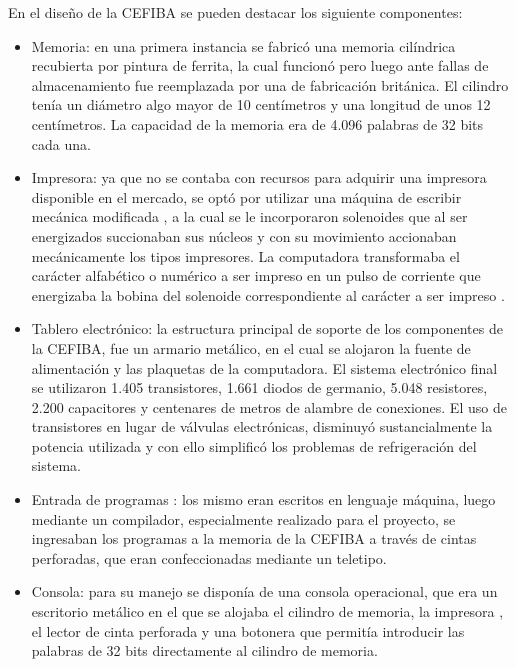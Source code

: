 \documentclass[%
 	final,
%
	notitlepage,
	narroweqnarray,
	inline,
 	twoside,
	]{ieee}
\begin{document}
En el dise\~no de la CEFIBA se pueden destacar los siguiente componentes:
\begin{itemize}
\item  Memoria: en una primera instancia se fabric\'o una memoria cil\'indrica recubierta por pintura de ferrita, la cual funcion\'o pero luego ante fallas de almacenamiento fue reemplazada por una de fabricaci\'on brit\'anica. El cilindro ten\'ia un di\'ametro algo mayor de 10 cent\'imetros y una longitud 
de unos 12 cent\'imetros. La capacidad de la memoria era de 4.096 palabras de 32 bits cada una.

\item Impresora: ya que no se contaba con recursos para adquirir una impresora disponible en el mercado, se opt\'o por utilizar una m\'aquina de escribir mec\'anica modificada , a la cual se le
incorporaron solenoides que al ser energizados succionaban sus n\'ucleos y con su movimiento accionaban mec\'anicamente los tipos impresores. La computadora transformaba el car\'acter alfab\'etico o num\'erico a ser impreso en un pulso de corriente que energizaba la bobina del solenoide correspondiente al car\'acter a ser impreso .

\item Tablero electr\'onico: la estructura principal de soporte de los componentes de la CEFIBA, fue un armario met\'alico, en el cual se alojaron la fuente de alimentaci\'on y las plaquetas de la computadora. El sistema electr\'onico final se utilizaron 1.405 transistores, 1.661 diodos de germanio, 5.048 resistores, 2.200 capacitores y centenares de metros de alambre de conexiones. El uso de transistores en lugar de v\'alvulas electr\'onicas, disminuy\'o sustancialmente la potencia utilizada y con 
ello simplific\'o los problemas de refrigeraci\'on del sistema.

\item Entrada de programas : los mismo eran escritos en lenguaje m\'aquina, luego mediante un compilador, especialmente realizado para el proyecto, se ingresaban los programas a la memoria de la CEFIBA a trav\'es de cintas perforadas, que eran confeccionadas mediante un teletipo.

\item Consola: para su manejo se dispon\'ia de una consola operacional, que era un escritorio met\'alico en el que se alojaba el cilindro de memoria, la impresora , el lector de cinta perforada y una botonera que permit\'ia introducir las palabras de 32 bits directamente al cilindro de memoria. 
\end{itemize}
\end{document}
